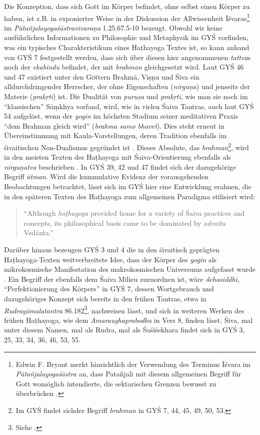 \documentclass[a4paper,12pt]{article}
\begin{document}
Die Konzeption, dass sich Gott im Körper befindet, ohne selbst einen Körper zu haben, ist z.B. in exponierter Weise in der Diskussion der Allwissenheit Īśvaras\footnote{Edwin F. Bryant merkt hinsichtlich der Verwendung des Terminus Īśvara im \textit{Pātañjalayogaśāstra} an, dass Patañjali mit diesem allgemeinen Begriff für Gott womöglich intendierte, die sektarischen Grenzen bewusst zu überbrücken \parencite[471-474]{bryant2009}.} im \textit{Pātañjalayogaśāstravivaraṇa} 1.25.67.5-10 \parencite[125]{harimoto2014} bezeugt. Obwohl wir keine ausführlichen Informationen zu Philosophie und Metaphysik im GYŚ vorfinden, was ein typisches Charakteristikum eines Haṭhayoga Textes ist, so kann anhand von GYŚ 7 festgestellt werden, dass sich über diesen hier angenommenen \textit{tattva}s noch der \textit{ekabindu} befindet, der mit \textit{brahman} gleichgesetzt wird. Laut GYŚ 46 und 47 existiert unter den Göttern Brahmā, Viṣṇu und Śiva ein alldurchdringender Herrscher, der ohne Eigenschaften (\textit{nirguṇa}) und jenseits der Materie (\textit{prakṛti}) ist. Die Dualität von \textit{puruṣa} und \textit{prakṛti}, wie man sie noch im ``klassischen'' Sāṃkhya vorfand, wird, wie in vielen Śaiva Tantras, auch laut GYŚ 54 aufgelöst, wenn der \textit{yogin} im höchsten Stadium seiner meditativen Praxis ``dem Brahman gleich wird'' (\textit{brahma samo bhavet}). Dies steht erneut in Übereinstimmung mit Kaula-Vorstellungen, deren Tradition ebenfalls im śivaitischen Non-Dualismus gegründet ist \parencite[236]{mallinson2014b}. Dieses Absolute, das \textit{brahman}\footnote{Im GYŚ findet sichder Begriff  \textit{brahman} in GYŚ 7, 44, 45, 49, 50, 53.}, wird in den meisten Texten des Haṭhayoga mit Śaiva-Orientierung ebenfalls als \textit{nirguṇatva} beschrieben \parencite[238]{mallinson2014b}. In GYŚ 39, 42 und 47 findet sich der dazugehörige Begriff \textit{ātman}. Wird die kummulative Evidenz der vorausgehenden Beobachtungen betrachtet, lässt sich im GYŚ hier eine Entwicklung erahnen, die in den späteren Texten des Haṭhayoga zum allgemeinen Paradigma stilisiert wird: \begin{quote}``Although \textit{haṭhayoga} provided home for a variety of Śaiva practices and concepts, its philosophical basis came to be dominated by \textit{advaita} Vedānta.'' \parencite[238]{mallinson2014b} \end{quote} Darüber hinaus bezeugen GYŚ 3 und 4 die in den śivaitisch geprägten Haṭhayoga-Texten weitverbreitete Idee, dass der Körper des \textit{yogin} als mikrokosmische Manifestation des makrokosmischen Universums aufgefasst wurde \parencite[174]{rootsofyoga2017}. Ein Begriff der ebenfalls dem Śaiva Milieu zuzuordnen ist, wäre \textit{dehasiddhi}, ``Perfektionierung des Körpers'' in GYŚ 7, dessen Wortgebrauch und dazugehöriges Konzept sich bereits in den frühen Tantras, etwa in \textit{Rudrayāmalatantra} 86.182\footnote{Siehe \parencite{rudrayamala1937}.}, nachweisen lässt, und sich in weiteren Werken des frühen Haṭhayoga, wie dem \textit{Amaraughaprabodha} in Vers 8, finden lässt. Śiva, mal unter diesem Namen, mal als Rudra, mal als Śaśiśekhara findet sich in GYŚ 3, 25, 33, 34, 36, 46, 53, 55. 
\end{document}

